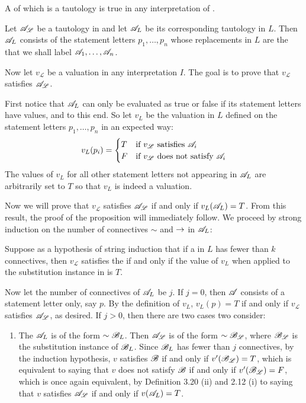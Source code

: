 \begin{proposition}
  A \wf{} of \cl{} which is a tautology is true in any interpretation of \cl{}.

  \prf{} Let \(\mathscr{A}_{\mathscr{L}}\) be a tautology in \cl{} and let \(\mathscr{A}_{L}\) be its corresponding tautology in \(L\). Then \(\mathscr{A}_{L}\) consists of the statement letters \(p_1, \dots, p_n\) whose replacements in \(L\) are the \wfs{} that we shall label \(\mathscr{A}_1, \dots, \mathscr{A}_n\). 

  Now let \(v_{\mathscr{L}}\) be a valuation in any interpretation \(I\). The goal is to prove that \(v_{\mathscr{L}}\) satisfies \(\mathscr{A}_{\mathscr{L}}\). 

  First notice that \(\mathscr{A}_L\) can only be evaluated as true or false if its statement letters have values, and to this end. So let \(v_L\) be the valuation in \(L\) defined on the statement letters \(p_1, \dots, p_n\) in an expected way:
  \[
    v_L(p_i) =
      \begin{cases}
        T   &\text{if \(v_{\mathscr{L}}\) satisfies \(\ensuremath\mathscr{A}_i\)}\\
        F   &\text{if \(v_{\mathscr{L}}\) does not satisfy \(\ensuremath\mathscr{A}_i\)}
      \end{cases}
  \]
  The values of \(v_L\) for all other statement letters not appearing in \(\mathscr{A}_L\) are arbitrarily set to \(T\) so that \(v_L\) is indeed a valuation.

  Now we will prove that \(v_{\mathscr{L}}\) satisfies \(\mathscr{A}_{\mathscr{L}}\) if and only if \(v_L(\mathscr{A}_L) = T\). From this result, the proof of the proposition will immediately follow. We proceed by strong induction on the number of connectives \(\sim\) and \(\rightarrow\) in \(\mathscr{A}_L\):

  Suppose as a hypothesis of string induction that if a \wf{} in \(L\) has fewer than \(k\) connectives, then \(v_{\mathscr{L}}\) satisfies the \wf{} if and only if the value of \(v_L\) when applied to the substitution instance in \cl{} is \(T\).

  Now let the number of connectives of \(\mathscr{A}_L\) be \(j\). If \(j = 0\), then \(\mathscr{A}\) consists of a statement letter only, say \(p\). By the definition of \(v_L\), \(v_L(p) = T\) if and only if \(v_{\mathscr{L}}\) satisfies \(\mathscr{A}_{\mathscr{L}}\), as desired. If \(j > 0\), then there are two cases two consider:

  \begin{enumerate}
    \item The \wf{} \(\mathscr{A}_L\) is of the form \(\sim\mathscr{B}_L\). Then \(\mathscr{A}_{\mathscr{L}}\) is of the form \(\sim\mathscr{B}_{\mathscr{L}}\), where \(\mathscr{B}_{\mathscr{L}}\) is the substitution instance of \(\mathscr{B}_L\). Since \(\mathscr{B}_L\) has fewer than \(j\) connectives, by the induction hypothesis, \(v\) satisfies \(\mathscr{B}\) if and only if \(v'(\mathscr{B}_{\mathscr{L}}) = T\), which is equivalent to saying that \(v\) does not satisfy \(\mathscr{B}\) if and only if \(v'(\mathscr{B}_{\mathscr{L}}) = F\), which is once again equivalent, by Definition 3.20 (ii) and 2.12 (i) to saying that \(v\) satisfies \(\mathscr{A}_{\mathscr{L}}\) if and only if \(v(\mathscr{A}_L) = T\).


\end{enumerate}
\end{proposition}
